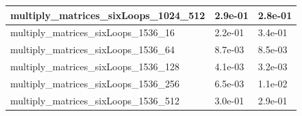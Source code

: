 \documentclass{scrartcl}
\begin{document}
\begin{table}[H]
\begin{tabular}{|l|l|l|}
multiply\_matrices\_sixLoops\_1024\_512 & 2.9e-01           & 2.8e-01            \\ \hline
multiply\_matrices\_sixLoops\_1536\_16  & 2.2e-01           & 3.4e-01            \\ \hline
multiply\_matrices\_sixLoops\_1536\_64  & 8.7e-03           & 8.5e-03            \\ \hline
multiply\_matrices\_sixLoops\_1536\_128 & 4.1e-03           & 3.2e-03            \\ \hline
multiply\_matrices\_sixLoops\_1536\_256 & 6.5e-03           & 1.1e-02            \\ \hline
multiply\_matrices\_sixLoops\_1536\_512 & 3.0e-01           & 2.9e-01            \\ \hline
\end{tabular}
\end{table}
\end{document}
